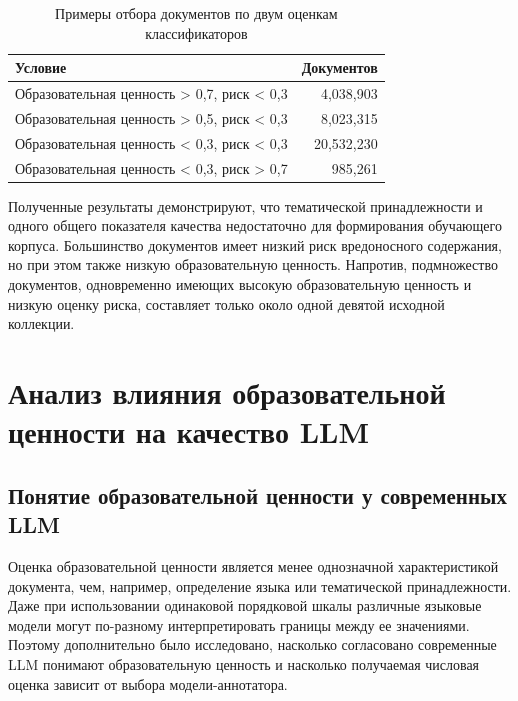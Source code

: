 \documentclass[12pt,a4paper]{article}
\begin{document}
\begin{table}[!ht]
\centering
\caption{Примеры отбора документов по двум оценкам классификаторов}
\label{tab:feature-groups}
\begin{tabular}{p{}r}
\hline
Условие & Документов \\
\hline
Образовательная ценность > 0,7, риск < 0,3 &
4,038,903 \\

Образовательная ценность > 0,5, риск < 0,3 &
8,023,315 \\

Образовательная ценность < 0,3, риск < 0,3 &
20,532,230 \\

Образовательная ценность < 0,3, риск > 0,7 &
985,261 \\

\hline
\end{tabular}
\end{table}

Полученные результаты демонстрируют, что тематической принадлежности и одного общего показателя качества недостаточно 
для формирования обучающего корпуса. 
Большинство документов имеет низкий риск вредоносного содержания, но при этом также низкую образовательную ценность. 
Напротив, подмножество документов, одновременно имеющих высокую образовательную ценность и низкую оценку риска, 
составляет только около одной девятой исходной коллекции.

\section{Анализ влияния образовательной ценности на качество LLM}
\label{sec:edu-pretraining}

\subsection{Понятие образовательной ценности у современных LLM}

Оценка образовательной ценности является менее однозначной характеристикой документа, 
чем, например, определение языка или тематической принадлежности. 
Даже при использовании одинаковой порядковой шкалы различные языковые модели 
могут по-разному интерпретировать границы между ее значениями. 
Поэтому дополнительно было исследовано, насколько согласовано современные LLM 
понимают образовательную ценность и насколько получаемая числовая оценка зависит 
от выбора модели-аннотатора.
\end{document}
